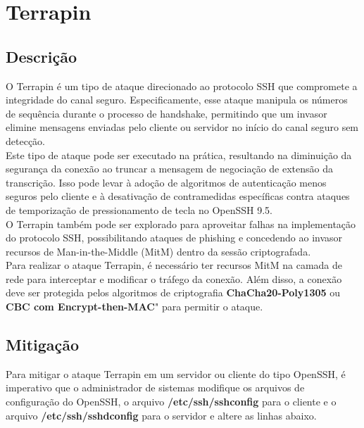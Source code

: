 \documentclass[12pt]{article}
\begin{document}
\section{Terrapin}

\subsection{Descrição}

O Terrapin é um tipo de ataque direcionado ao protocolo SSH que compromete a integridade do canal seguro. Especificamente, esse ataque manipula os números de sequência durante o processo de handshake, permitindo que um invasor elimine mensagens enviadas pelo cliente ou servidor no início do canal seguro sem detecção.\\

Este tipo de ataque pode ser executado na prática, resultando na diminuição da segurança da conexão ao truncar a mensagem de negociação de extensão da transcrição. Isso pode levar à adoção de algoritmos de autenticação menos seguros pelo cliente e à desativação de contramedidas específicas contra ataques de temporização de pressionamento de tecla no OpenSSH 9.5.\\

O Terrapin também pode ser explorado para aproveitar falhas na implementação do protocolo SSH, possibilitando ataques de phishing e concedendo ao invasor recursos de Man-in-the-Middle (MitM) dentro da sessão criptografada.\\

Para realizar o ataque Terrapin, é necessário ter recursos MitM na camada de rede para interceptar e modificar o tráfego da conexão. Além disso, a conexão deve ser protegida pelos algoritmos de criptografia \textbf{ChaCha20-Poly1305} ou \textbf{CBC com Encrypt-then-MAC}" para permitir o ataque.\\

\subsection{Mitigação}

Para mitigar o ataque Terrapin em um servidor ou cliente do tipo OpenSSH, é imperativo que o administrador de sistemas modifique os arquivos de configuração do OpenSSH, o arquivo \textbf{/etc/ssh/ssh\underline{\hspace{.1in}}config} para o cliente e o arquivo \textbf{/etc/ssh/sshd\underline{\hspace{.1in}}config} para o servidor e altere as linhas abaixo.
\end{document}
